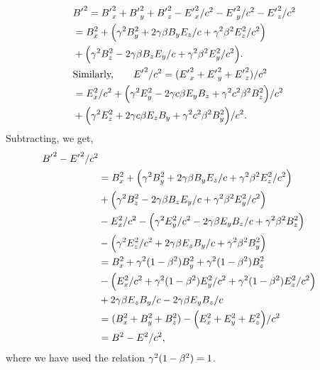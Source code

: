 \begin{scriptsize}
\begin{align*}
&{B'}^2={B'}_x^2+{B'}_y^2+{B'}_z^2-{E'}_x^2/c^2
-{E'}_y^2/c^2-{E'}_z^2/c^2 \\
&= B_x^2+\Big(\gamma^2 B_y^2
+2\gamma{\beta} B_y E_z/c +\gamma^2{\beta}^2 E_z^2/c^2\Big)\\
&+\Big(\gamma^2 B_z^2 - 2\gamma{\beta} B_z E_y/c +
\gamma^2{\beta}^2 E_y^2/c^2\Big).\notag\\
&\text{Similarly,}
\qquad{\ensuremath{E'}}^2/c^2=({E'}_x^2+{E'}_y^2+{E'}_z^2)/c^2\\
&=E_x^2/c^2+\Big(\gamma^ 2 E_y^2
-2\gamma c{\beta} E_y B_z +\gamma^2 c^2{\beta}^2 B_z^2\Big)/c^2\\
&+\Big(\gamma^2E_z^2 +2\gamma c{\beta} E_z B_y
+\gamma^2 
c^2{\beta}^2B_y^2\Big)/c^2.
\end{align*} 
Subtracting, we get,
\begin{align*}
{\ensuremath{B'}}^2- {E'}^2/c^2\\
&=B_x^2+\Big(\gamma^2 B_y^2
+2\gamma{\beta} B_y E_z/c 
+\gamma^2{\beta}^2 E_z^2/c^2\Big)\\
& +\Big(\gamma^2 B_z^2 - 2\gamma{\beta} B_z E_y/c +
\gamma^2{\beta}^2 E_y^2/c^2\Big)\\
&-E_x^2/c^2-\Big(\gamma^ 2 E_y^2 /c^2
-2\gamma {\beta} E_y B_z /c
+\gamma^2 {\beta}^2 B_z^2\Big)\\
&-\Big(\gamma^2E_z^2/c^2 +2\gamma {\beta} E_z B_y/c
+\gamma^2 {\beta}^2B_y^2\Big)\\
&=B_x^2 +\gamma^2(1-{\beta}^2)B_y^2
+\gamma^2(1-{\beta}^2)B_z^2\\
&-\Big(E_x^2/c^2+\gamma^2(1-{\beta}^2)E_y^2/c^2
+\gamma^2(1-{\beta}^2)E_z^2/c^2\Big)\\
& +2\gamma {\beta} E_z B_y/c
-2\gamma {\beta} E_y B_z /c\\
&=(B_x^2 +B_y^2+B_z^2)
-\Big(E_x^2+E_y^2 +E_z^2 \Big)/c^2\\
&=B^2-E^2/c^2,
\end{align*}
where we have used  the relation 
$\gamma^2(1-{\beta}^2)=1$.
\end{scriptsize}
\ebxns
